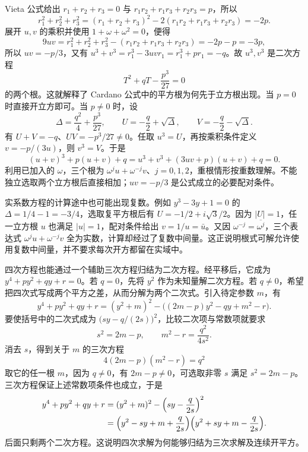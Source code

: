 \ProseParagraphBreak
Vieta 公式给出 \(r_1+r_2+r_3=0\) 与 \(r_1r_2+r_1r_3+r_2r_3=p\)，所以
\[
	r_1^2+r_2^2+r_3^2 =(r_1+r_2+r_3)^2-2(r_1r_2+r_1r_3+r_2r_3)=-2p.
\]
展开 \(u,v\) 的乘积并使用 \(1+\omega+\omega^2=0\)，便得
\[
	9uv=r_1^2+r_2^2+r_3^2-(r_1r_2+r_1r_3+r_2r_3) =-2p-p=-3p,
\]
所以 \(uv=-p/3\)，又有 \(u^3+v^3=r_1^3-3uvr_1=r_1^3+pr_1=-q\)。故 \(u^3,v^3\) 是二次方程
\[
	T^2+qT-\frac{p^3}{27}=0
\]
的两个根。这就解释了 Cardano 公式中的平方根为何先于立方根出现。当 \(p=0\) 时直接开立方即可。当 \(p\neq0\) 时，设
\[
	\Delta=\frac{q^2}{4}+\frac{p^3}{27},\qquad U=-\frac q2+\sqrt\Delta,\qquad V=-\frac q2-\sqrt\Delta.
\]
有 \(U+V=-q\)、\(UV=-p^3/27\neq0\)。任取 \(u^3=U\)，再按乘积条件定义 \(v=-p/(3u)\)，则 \(v^3=V\)。于是
\[
	(u+v)^3+p(u+v)+q=u^3+v^3+(3uv+p)(u+v)+q=0.
\]
利用已加入的 \(\omega\)，三个根为 \(\omega^j u+\omega^{-j}v\)、\(j=0,1,2\)，重根情形按重数理解。不能独立选取两个立方根后直接相加；\(uv=-p/3\) 是公式成立的必要配对条件。

\ProseParagraphBreak
实系数方程的计算途中也可能出现复数。例如 \(y^3-3y+1=0\) 的 \(\Delta=1/4-1=-3/4\)，选取复平方根后有 \(U=-1/2+i\sqrt3/2\)。因为 \(|U|=1\)，任一立方根 \(u\) 也满足 \(|u|=1\)，配对条件给出 \(v=1/u=\bar u\)。又因 \(\omega^{-j}=\overline{\omega^j}\)，三个表达式 \(\omega^j u+\omega^{-j}v\) 全为实数，计算却经过了复数中间量。这正说明根式可解允许使用复数中间量，并不要求每次开方都留在实域中。

\ProseParagraphBreak
四次方程也能通过一个辅助三次方程归结为二次方程。经平移后，它成为 \(y^4+py^2+qy+r=0\)。若 \(q=0\)，先将 \(y^2\) 作为未知量解二次方程。若 \(q\neq0\)，希望把四次式写成两个平方之差，从而分解为两个二次式。引入待定参数 \(m\)，有
\[
	y^4+py^2+qy+r =(y^2+m)^2-\bigl((2m-p)y^2-qy+m^2-r\bigr).
\]
要使括号中的二次式成为 \(\bigl(sy-q/(2s)\bigr)^2\)，比较二次项与常数项就要求
\[
	s^2=2m-p,\qquad m^2-r=\frac{q^2}{4s^2}.
\]
消去 \(s\)，得到关于 \(m\) 的三次方程
\[
	4(2m-p)(m^2-r)=q^2
\]
取它的任一根 \(m\)，因为 \(q\neq0\)，有 \(2m-p\neq0\)，可选取非零 \(s\) 满足 \(s^2=2m-p\)。三次方程保证上述常数项条件也成立，于是
\begin{align*}
	y^4+py^2+qy+r &=(y^2+m)^2-\Bigl(sy-\frac q{2s}\Bigr)^2\\
	&=\Bigl(y^2-sy+m+\frac q{2s}\Bigr) \Bigl(y^2+sy+m-\frac q{2s}\Bigr).
\end{align*}
后面只剩两个二次方程。这说明四次求解为何能够归结为三次求解及连续开平方。

